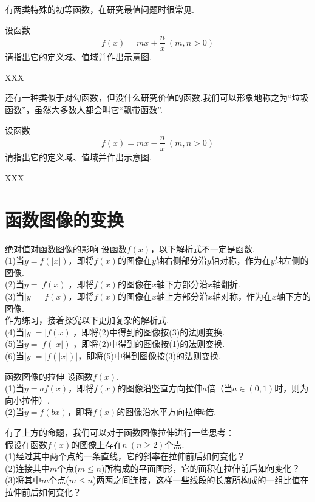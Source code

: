 \documentclass[lang=cn, zihao=5]{elegantbook}
\begin{document}
有两类特殊的初等函数，在研究最值问题时很常见.

\begin{problem}
    设函数$$f(x)=mx+\frac{n}{x}~(m,n>0)$$
    请指出它的定义域、值域并作出示意图.
\end{problem}
\begin{solution}
    XXX
\end{solution}

还有一种类似于对勾函数，但没什么研究价值的函数.我们可以形象地称之为“垃圾函数”，虽然大多数人都会叫它“飘带函数”.

\begin{problem}
    设函数$$f(x)=mx-\frac{n}{x}~(m,n>0)$$
    请指出它的定义域、值域并作出示意图.
\end{problem}
\begin{solution}
    XXX
\end{solution}

\section{函数图像的变换}

\begin{proposition}{绝对值对函数图像的影响}
    设函数$f(x)$，以下解析式不一定是函数.\\
    (1)当$y=f(|x|)$，即将$f(x)$的图像在$y$轴右侧部分沿$y$轴对称，作为在$y$轴左侧的图像.\\
    (2)当$y=|f(x)|$，即将$f(x)$的图像在$x$轴下方部分沿$x$轴翻折.\\
    (3)当$|y|=f(x)$，即将$f(x)$的图像在$x$轴上方部分沿$x$轴对称，作为在$x$轴下方的图像.\\
    作为练习，接着探究以下更加复杂的解析式.\\
    (4)当$|y|=|f(x)|$，即将(2)中得到的图像按(3)的法则变换.\\
    (5)当$y=|f(|x|)|$，即将(2)中得到的图像按(1)的法则变换.\\
    (6)当$|y|=|f(|x|)|$，即将(5)中得到图像按(3)的法则变换.
\end{proposition}

\begin{proposition}{函数图像的拉伸}
    设函数$f(x)$.\\
    (1)当$y=af(x)$，即将$f(x)$的图像沿竖直方向拉伸$a$倍（当$a\in (0,1)$时，则为向小拉伸）.\\
    (2)当$y=f(b x)$，即将$f(x)$的图像沿水平方向拉伸$b$倍.
\end{proposition}

\begin{problem}
    有了上方的命题，我们可以对于函数图像拉伸进行一些思考：\\
    假设在函数$f(x)$的图像上存在$n~(n \geq 2)$个点.\\
    (1)经过其中两个点的一条直线，它的斜率在拉伸前后如何变化？\\
    (2)连接其中$m$个点($m \leq n$)所构成的平面图形，它的面积在拉伸前后如何变化？\\
    (3)将其中$m$个点($m \leq n$)两两之间连接，这样一些线段的长度所构成的一组比值在拉伸前后如何变化？\\
\end{problem}
\end{document}
